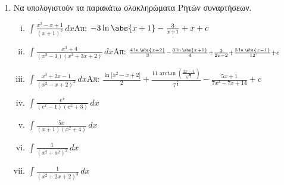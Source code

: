 \begin{enumerate}
\item Να υπολογιστούν τα παρακάτω ολοκληρώματα Ρητών συναρτήσεων. 

\begin{enumerate}[i)]
\item $\int \frac{x^2-x+1}{(x+1)^2}\,dx$\hfill Απ: $-3\ln\abs{x+1}-\frac{3}{x+1}+x+c$
\item $\int\frac{x^3+4}{(x^2-1)(x^2+3x+2)}\,dx$\hfill Απ: $\scriptstyle{\frac{4\ln\abs{x+2}}{3}-\frac{3\ln\abs{x+1}}{4}+\frac{3}{2x+2}+\frac{5\ln\abs{x-1}}{12}+c}$
\item $\int\frac{x^3+2x-1}{(x^2-x+2)^2}\,dx$\hfill Απ: $\scriptstyle\frac{\ln|x^2-x+2|}{2}+\frac{11\arctan(\frac{2x-1}{\sqrt{7}})}{7^{\frac{3}{2}}}-\frac{5x+1}{7x^2-7x+14}+c$
\item $\int\frac{e^x}{(e^x-1)(e^x+3)}\,dx$
\item $\int\frac{5x}{(x+1)(x^2+4)}\,dx$
\item $\int\frac{1}{(x^2+a^2)^2}\,dx$
\item $\int\frac{1}{(x^2+2x+2)^3}\,dx$



\end{enumerate}

\end{enumerate}




